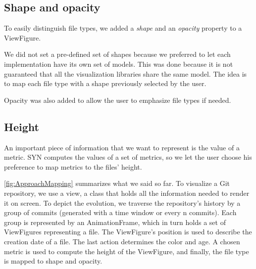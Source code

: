 \subsection*{Shape and opacity}
To easily distinguish file types, we added a \textit{shape} and an \textit{opacity} property to a ViewFigure.

We did not set a pre-defined set of shapes because we preferred to let each implementation have its own set of models. This was done because it is not guaranteed that all the visualization libraries share the same model. The idea is to map each file type with a shape previously selected by the user. 

Opacity was also added to allow the user to emphasize file types if needed. 


\subsection*{Height}
An important piece of information that we want to represent is the value of a metric. SYN computes the values of a set of metrics, so we let the user choose his preference to map metrics to the files' height. 


\autoref{fig:ApproachMapping} summarizes what we said so far. To visualize a Git repository, we use a view, a class that holds all the information needed to render it on screen. To depict the evolution, we traverse the repository's history by a group of commits (generated with a time window or every n commits). Each group is represented by an AnimationFrame, which in turn holds a set of ViewFigures representing a file. The ViewFigure's position is used to describe the creation date of a file. The last action determines the color and age. A chosen metric is used to compute the height of the ViewFigure, and finally, the file type is mapped to shape and opacity. 


